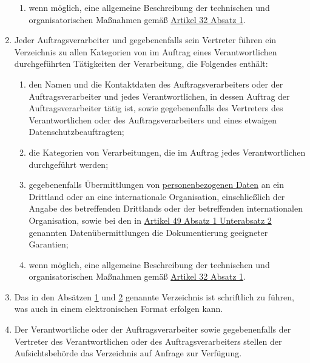 \begin{enumerate}
\begin{enumerate}
    \item wenn möglich, eine allgemeine Beschreibung der technischen und organisatorischen Maßnahmen gemäß
     \hyperref[itm:32-1]{Artikel 32 Absatz 1}.
    \label{itm:30-1g}

  \end{enumerate}

  \item Jeder Auftragsverarbeiter und gegebenenfalls sein Vertreter führen ein Verzeichnis zu allen Kategorien von im
   Auftrag eines Verantwortlichen durchgeführten Tätigkeiten der Verarbeitung, die Folgendes enthält:
  \label{itm:30-2}

  \begin{enumerate}
  
    \item den Namen und die Kontaktdaten des Auftragsverarbeiters oder der Auftragsverarbeiter und jedes
     Verantwortlichen, in dessen Auftrag der Auftragsverarbeiter tätig ist, sowie gegebenenfalls des Vertreters des
     Verantwortlichen oder des Auftragsverarbeiters und eines etwaigen Datenschutzbeauftragten;
    \label{itm:30-2a}

    \item die Kategorien von Verarbeitungen, die im Auftrag jedes Verantwortlichen durchgeführt werden;
    \label{itm:30-2b}

    \item gegebenenfalls Übermittlungen von \hyperref[itm:04-1]{personenbezogenen Daten} an ein Drittland oder an eine internationale
     Organisation, einschließlich der Angabe des betreffenden Drittlands oder der betreffenden internationalen
     Organisation, sowie bei den in \hyperref[itm:49-1-2]{Artikel 49 Absatz 1 Unterabsatz 2} genannten
     Datenübermittlungen die Dokumentierung geeigneter Garantien;
    \label{itm:30-2c}

    \item wenn möglich, eine allgemeine Beschreibung der technischen und organisatorischen Maßnahmen gemäß \hyperref
     [itm:32-1]{Artikel 32 Absatz 1}.
    \label{itm:30-2d}

  \end{enumerate}

  \item Das in den Absätzen \hyperref[itm:30-1]{1} und \hyperref[itm:30-2]{2} genannte Verzeichnis ist schriftlich zu
   führen, was auch in einem elektronischen Format erfolgen kann.
  \label{itm:30-3}

  \item Der Verantwortliche oder der Auftragsverarbeiter sowie gegebenenfalls der Vertreter des Verantwortlichen oder
   des Auftragsverarbeiters stellen der Aufsichtsbehörde das Verzeichnis auf Anfrage zur Verfügung.
  \label{itm:30-4}


\end{enumerate}
